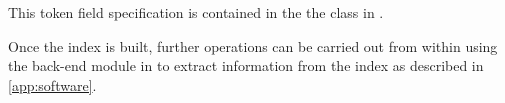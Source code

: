 This token field specification is contained in the the  class in .

Once the index is built, further operations can be carried out from within  using the  back-end module in  to extract information from the index as described in \autoref{app:software}.
